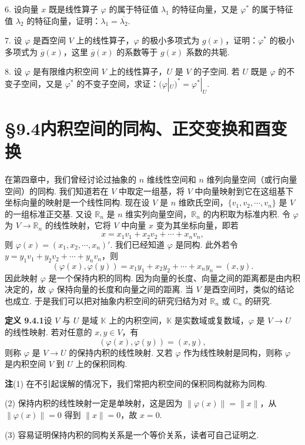 \documentclass[UTF8,12pt,a4paper,fontset=fandol]{ctexart}
\begin{document}
6. 设向量 $x$ 既是线性算子 $\varphi$ 的属于特征值 $\lambda_1$ 的特征向量，又是 $\varphi^*$ 的属于特征值 $\lambda_2$ 的特征向量，证明：$\lambda_1=\overline{\lambda_2}$.

7. 设 $\varphi$ 是酉空间 $V$ 上的线性算子，$\varphi$ 的极小多项式为 $g(x)$，证明：$\varphi^*$ 的极小多项式为 $\overline{g}(x)$，这里 $\overline{g}(x)$ 的系数等于 $g(x)$ 系数的共轭.

8. 设 $\varphi$ 是有限维内积空间 $V$ 上的线性算子，$U$ 是 $V$ 的子空间. 若 $U$ 既是 $\varphi$ 的不变子空间，又是 $\varphi^*$ 的不变子空间，求证：$(\varphi|_U)^*=\varphi^*|_U$.

\section*{§9.4\quad 内积空间的同构、正交变换和酉变换}

在第四章中，我们曾经讨论过抽象的 $n$ 维线性空间和 $n$ 维列向量空间（或行向量空间）的同构. 我们知道若在 $V$ 中取定一组基，将 $V$ 中向量映射到它在这组基下坐标向量的映射是一个线性同构. 现在设 $V$ 是 $n$ 维欧氏空间，$\{v_1,v_2,\cdots,v_n\}$ 是 $V$ 的一组标准正交基. 又设 $\mathbb R_n$ 是 $n$ 维实列向量空间，$\mathbb R_n$ 的内积取为标准内积. 令 $\varphi$ 为 $V\to\mathbb R_n$ 的线性映射，它将 $V$ 中向量 $x$ 变为其坐标向量，即若
\[
  x=x_1v_1+x_2v_2+\cdots+x_nv_n,
\]
则 $\varphi(x)=(x_1,x_2,\cdots,x_n)'$. 我们已经知道 $\varphi$ 是同构. 此外若令 $y=y_1v_1+y_2v_2+\cdots+y_nv_n$，则
\[
  (\varphi(x),\varphi(y))=x_1y_1+x_2y_2+\cdots+x_ny_n=(x,y).
\]
因此映射 $\varphi$ 是一个保持内积的同构. 因为向量的长度、向量之间的距离都是由内积决定的，故 $\varphi$ 保持向量的长度和向量之间的距离. 当 $V$ 是酉空间时，类似的结论也成立. 于是我们可以把对抽象内积空间的研究归结为对 $\mathbb R_n$ 或 $\mathbb C_n$ 的研究.

\noindent\textbf{定义 9.4.1}\quad 设 $V$ 与 $U$ 是域 $\mathbb K$ 上的内积空间，$\mathbb K$ 是实数域或复数域，$\varphi$ 是 $V\to U$ 的线性映射. 若对任意的 $x,y\in V$，有
\[
  (\varphi(x),\varphi(y))=(x,y),
\]
则称 $\varphi$ 是 $V\to U$ 的保持内积的线性映射. 又若 $\varphi$ 作为线性映射是同构，则称 $\varphi$ 是内积空间 $V$ 到 $U$ 上的保积同构.

\noindent\textbf{注}\quad (1) 在不引起误解的情况下，我们常把内积空间的保积同构就称为同构.

(2) 保持内积的线性映射一定是单映射，这是因为 $\|\varphi(x)\|=\|x\|$，从 $\|\varphi(x)\|=0$ 得到 $\|x\|=0$，故 $x=0$.

(3) 容易证明保持内积的同构关系是一个等价关系，读者可自己证明之.
\end{document}
